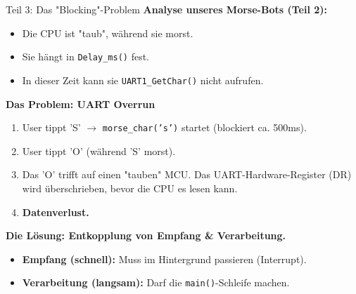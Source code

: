 \documentclass{beamer}
\begin{document}
\begin{frame}{Teil 3: Das "Blocking"-Problem}
	\textbf{Analyse unseres Morse-Bots (Teil 2):}
	\begin{itemize}
		\item Die CPU ist "taub", während sie morst.
		\item Sie hängt in \texttt{Delay\_ms()} fest.
		\item In dieser Zeit kann sie \texttt{UART1\_GetChar()} nicht aufrufen.
	\end{itemize}
	
	\bigskip
	\textbf{Das Problem: UART Overrun}
	\begin{enumerate}
		\item User tippt 'S' $\rightarrow$ \texttt{morse\_char('s')} startet (blockiert ca. 500ms).
		\item User tippt 'O' (während 'S' morst).
		\item Das 'O' trifft auf einen "tauben" MCU. Das UART-Hardware-Register (DR) wird überschrieben, bevor die CPU es lesen kann.
		\item \textbf{Datenverlust.}
	\end{enumerate}
	
	\medskip
	\textbf{Die Lösung: Entkopplung von Empfang \& Verarbeitung.}
	\begin{itemize}
		\item \textbf{Empfang (schnell):} Muss im Hintergrund passieren (Interrupt).
		\item \textbf{Verarbeitung (langsam):} Darf die \texttt{main()}-Schleife machen.
	\end{itemize}
\end{frame}
\end{document}
